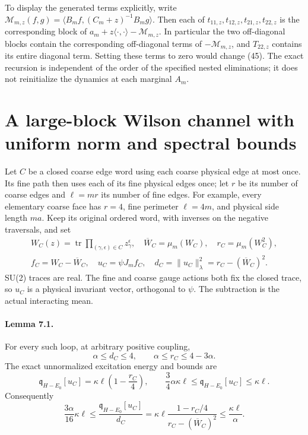\documentclass[11pt]{article}
\newcommand{\tr}{\operatorname{tr}}
\begin{document}
To display the generated terms explicitly, write
$\mathcal M_{m,z}(f,g)=\langle B_mf,(C_m+z)^{-1}B_mg\rangle$.
Then each of $t_{11,z},t_{12,z},t_{21,z},t_{22,z}$ is the corresponding
block of $a_m+z\langle\cdot,\cdot\rangle-\mathcal M_{m,z}$.
In particular the two off-diagonal blocks contain the corresponding
off-diagonal terms of $-\mathcal M_{m,z}$, and $T_{22,z}$ contains its
entire diagonal term. Setting these terms to zero would change
(45). The exact recursion is independent of the order of
the specified nested eliminations; it does not reinitialize the dynamics
at each marginal $A_m$.

\section{A large-block Wilson channel with uniform norm and spectral bounds}

Let $C$ be a closed coarse edge word using each coarse physical edge at
most once. Its fine path then uses each of its fine physical edges once;
let $r$ be its number of coarse edges and $\ell=mr$ its number of fine
edges. For example, every elementary coarse face has $r=4$, fine perimeter
$\ell=4m$, and physical side length $ma$. Keep its original ordered word,
with inverses on the negative traversals, and set
\begin{gather}
 W_C(z)=\tr\prod_{(\gamma,\epsilon)\in C}z_\gamma^\epsilon,\quad
 \overline W_C=\mu_m(W_C),\quad r_C=\mu_m(W_C^2),\nonumber\\
 f_C=W_C-\overline W_C,\quad u_C=\psi J_mf_C,\quad
 d_C=\|u_C\|_\lambda^2=r_C-(\overline W_C)^2.\label{eq:loop}
\end{gather}
SU(2) traces are real. The fine and coarse gauge actions both fix the
closed trace, so $u_C$ is a physical invariant vector, orthogonal to
$\psi$. The subtraction is the actual interacting mean.

\paragraph{Lemma 7.1.}
For every such loop, at arbitrary positive coupling,
\begin{equation}\label{eq:loopnorm}
 \alpha\leq d_C\leq4,\qquad
 \alpha\leq r_C\leq4-3\alpha.
\end{equation}
The exact unnormalized excitation energy and bounds are
\begin{equation}\label{eq:loopenergy}
 \mathfrak q_{H-E_0}[u_C]
   =\kappa\ell\left(1-\frac{r_C}{4}\right),\qquad
 \frac34\alpha\kappa\ell\leq\mathfrak q_{H-E_0}[u_C]\leq\kappa\ell.
\end{equation}
Consequently
\begin{equation}\label{eq:loopquotient}
 \frac{3\alpha}{16}\kappa\ell\leq
 \frac{\mathfrak q_{H-E_0}[u_C]}{d_C}
 =\kappa\ell\frac{1-r_C/4}{r_C-(\overline W_C)^2}
 \leq\frac{\kappa\ell}{\alpha}.
\end{equation}
\end{document}
